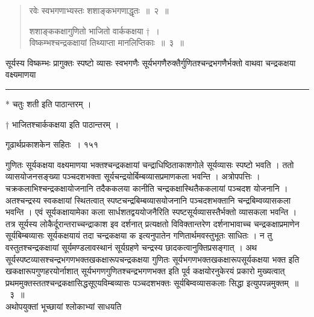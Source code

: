 \documentclass[11pt, openany]{book}
\begin{document}
\begin{quote}
  {\ssi रवेः स्वभगणाभ्यस्तः शशाङ्कभगणाद्धृतः~॥~२~॥
  
शशाङ्ककक्षागुणितो भाजितो वार्ककक्षया †~।\\
विष्कम्भश्चन्द्रकक्षायां तिथ्याप्ता मानलिप्तिकाः~॥~३~॥}
\end{quote}


सूर्यस्य विष्कम्भः प्रागुक्तः स्पष्टो व्यासः स्वभगणैः सूर्यभगणैरुक्तैर्गुणितश्चन्द्रभगणैर्भक्तो वाथवा चन्द्रकक्षया वक्ष्यमाणया

\rule{\linewidth}{.5pt}

\begin{center}
 * चतुः शती इति पाठान्तरम् ।
 
† भाजितश्चार्ककक्षया इति पाठान्तरम् ।
\end{center}


\newpage



\hspace{3cm} गूढार्थप्रकाशकेन सहितः~। \hfill १५१
\vspace{1cm}

\begin{sloppypar}
\noindent गुणितः सूर्यकक्षया वक्ष्यमाणया भक्तश्चन्द्रकक्षायां चन्द्राधिष्ठिताकाशगोले सूर्यव्यासः स्पष्टो भवति । ततो व्यासयोजनसङ्ख्या पञ्चदशभक्ता सूर्यचन्द्रयोर्बिम्बव्यासप्रमाणकला भवन्ति । अत्रोपपत्तिः । चक्रकलाभिश्चन्द्रकक्षायोजनानि तदैककलया कानीति चन्द्रकक्षास्थितैककलायां पञ्चदश योजनानि । अतश्चन्द्रस्य स्वकक्षायां स्थितत्वात् स्पष्टचन्द्रबिम्बव्यासयोजनानि पञ्चदशभक्तानि चन्द्रबिम्वव्यासकला भवन्ति । एवं सूर्यकक्षायामेका कला सार्धशतद्वययोजनैरिति स्पष्टसूर्यव्यासस्तैर्भक्तो व्यासकला भवन्ति । तत्र सूर्यस्य लोकैर्दूरान्तराच्चन्द्राकाश इव दर्शनात् प्रत्यक्षतो विविक्तान्तरेण दर्शनाभावाच्च चन्द्रकक्षाप्रमाणेन सूर्यबिम्बव्यासः सूर्यकक्षयायं तदा चन्द्रकक्षया क इत्यनुपातेन गणितार्थमवस्तुभूतः साधितः । न तु वस्तुतश्चन्द्रकक्षायां सूर्यमण्डलावस्थानं सूर्यग्रहणे चन्द्रस्य छादकत्वानुक्तिप्रसङ्गात् । अथ सूर्यस्पष्टव्यासश्चन्द्रभगणभक्तखकक्षारूपचन्द्रकक्षया गुणितः सूर्यभगणभक्तखकक्षारूपसूर्यकक्षया भक्त इति खकक्षारूपगुणहरयोर्नाशात् सूर्यभगणगुणितश्चन्द्रभगणभक्त इति पूर्व कक्षयोरनुकेरयं प्रकारो मुख्यत्वात् प्रथममुक्तस्ततश्चन्द्रकक्षासिद्धसूएयविम्बव्यासः पञ्चदशभक्तः सूर्यबिम्वव्यासकलाः सिद्धा इत्युपपन्नमुक्तम्~॥~३~॥\\
\noindent अथोपयुक्तां भूच्छायां श्लोकाभ्यां साधयति\textendash
\end{sloppypar}
\end{document}
